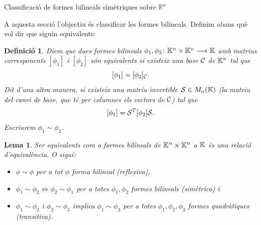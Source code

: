 \documentclass[
  11pt,
]{book}
\makeatletter
\numberwithin{dummy}{section}
\theoremstyle{maincolornumbox}
\theoremstyle{blacknumex}
\theoremstyle{blacknumbox}
\newtheorem{definitionT}{Definició}[chapter]
\theoremstyle{maincolornum}
\newtheorem{lemmaT}{Lema}[chapter]
\newenvironment{lemma}{\begin{pBox}\begin{lemmaT}}{\end{lemmaT}\end{pBox}}
\newenvironment{definition}{\begin{dBox}\begin{definitionT}}{\end{definitionT}\end{dBox}}
\renewcommand{\section}{\@startsection{section}{1}{\z@}
{-4ex \@plus -1ex \@minus -.4ex}
{1ex \@plus.2ex }
{\normalfont\large\sffamily\bfseries}}
\newlength\esp
\makeatother
\begin{document}
\hypertarget{classificaciuxf3-de-formes-bilineals-simuxe8triques-sobre-mathbbrn}{%
\section{\texorpdfstring{Classificació de formes bilineals simètriques sobre \(\mathbb{R}^n\)}{Classificació de formes bilineals simètriques sobre \textbackslash mathbb\{R\}\^{}n}}\label{classificaciuxf3-de-formes-bilineals-simuxe8triques-sobre-mathbbrn}}

A aquesta secció l'objectiu és classificar les formes bilineals. Definim
abans què vol dir que siguin equivalents:

\begin{definition}
Diem que dues formes bilineals
\(\phi_1,\phi_2\colon \mathbb{K}^n\times\mathbb{K}^n\longrightarrow \mathbb{K}\) amb matrius corresponents
\([\phi_1]\) i \([\phi_2]\) \emph{són equivalents} si existeix una base \(\mathcal{C}\)
de \(\mathbb{K}^n\) tal que \[[\phi_1]=[\phi_2]_{\mathcal{C}} .\] Dit d'una altra manera,
si existeix una matriu invertible \(\mathcal{S}\in M_n(\mathbb{K})\) (la matriu del
canvi de base, que té per columnes els vectors de \(\mathcal{C}\)) tal que
\[[\phi_1]=\mathcal{S}^T [\phi_2] \mathcal{S}.\] Escriurem \(\phi_1\sim \phi_2\).
\end{definition}

\begin{lemma}

Ser equivalents com a formes bilineals de \(\mathbb{K}^n\times \mathbb{K}^n\) a \(\mathbb{K}\) és
una relació d'equivalència. O sigui:

\begin{itemize}
\item
  \(\phi \sim \phi\) per a tot \(\phi\) forma bilineal (reflexiva),
\item
  \(\phi_1\sim \phi_2 \Leftrightarrow \phi_2 \sim \phi_1\) per a totes
  \(\phi_1, \phi_2\) formes bilineals (simètrica) i
\item
  \(\phi_1\sim \phi_2\) i \(\phi_2\sim \phi_3\) implica
  \(\phi_1\sim \phi_3\) per a totes \(\phi_1,\phi_2,\phi_3\) formes
  quadràtiques (transitiva).
\end{itemize}

\end{lemma}
\end{document}
